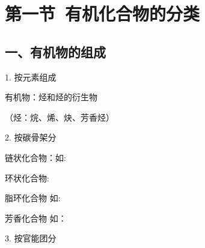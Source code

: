 \documentclass{book}
\begin{document}
\section{第一节\ 有机化合物的分类}	

\subsection{一、有机物的组成}
1. 按元素组成 \par
有机物：烃和烃的衍生物 \par
（烃：烷、烯、炔、芳香烃）
\newline \par
2. 按碳骨架分\par
链状化合物：如:
\newline \par
环状化合物:\par
脂环化合物 如:\hspace{0.8mm} \par
芳香化合物 如：
\newline \par

3. 按官能团分
\end{document}
